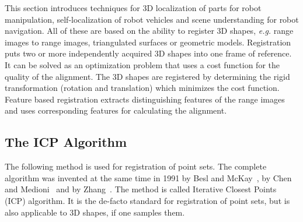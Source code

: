 \documentclass[twocolumn,oneside]{book}
\begin{document}
This section introduces techniques for 3D localization of parts for
robot manipulation, self-localization of robot vehicles and scene
understanding for robot navigation.  All of these are based on the
ability to register 3D shapes, {\it e.g.}  range images to range
images, triangulated surfaces or geometric models.  Registration puts
two or more independently acquired 3D shapes into one frame of
reference. It can be solved as an optimization problem that uses a
cost function for the quality of the alignment. The 3D shapes are
registered by determining the rigid transformation (rotation and
translation) which minimizes the cost function. Feature based
registration extracts distinguishing features of the range images and
uses corresponding features for calculating the alignment.

\subsection{The ICP Algorithm}\label{sec:icp6D}

The following method is used for registration of point sets. The
complete algorithm was invented at the same time in 1991 by Besl and
McKay~\cite{besl2}, by Chen and Medioni~\cite{chen2} and by
Zhang~\cite{zhang2}. The method is called Iterative Closest Points
(ICP) algorithm. It is the de-facto standard for registration of point
sets, but is also applicable to 3D shapes, if one samples them.
\end{document}
